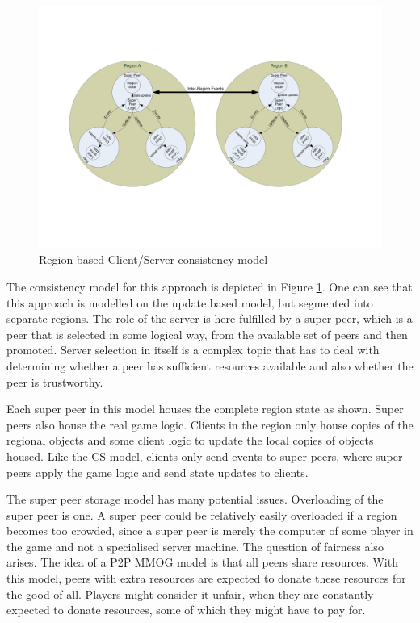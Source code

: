 \documentclass[journal,oneside,a4paper,onecolumn]{IEEEtran}
\begin{document}
\begin{figure}[htbp]
 \centering
 \includegraphics[clip=true, viewport=2cm 5cm 27cm 16.5cm, width=\columnwidth]{region_based_CS_CM}
 \caption{Region-based Client/Server consistency model}
 \label{fig_cs_region_cm}
\end{figure}
%
The consistency model for this approach is depicted in Figure \ref{fig_cs_region_cm}. One can see that this approach is modelled on the update based model, but segmented into separate regions. The role of the server is here fulfilled by a super peer, which is a peer that is selected in some logical way, from the available set of peers and then promoted. Server selection in itself is a complex topic that has to deal with determining whether a peer has sufficient resources available and also whether the peer is trustworthy.

Each super peer in this model houses the complete region state as shown. Super peers also house the real game logic. Clients in the region only house copies of the regional objects and some client logic to update the local copies of objects housed. Like the \ac{CS} model, clients only send events to super peers, where super peers apply the game logic and send state updates to clients.

The super peer storage model has many potential issues. Overloading of the super peer is one. A super peer could be relatively easily overloaded if a region becomes too crowded, since a super peer is merely the computer of some player in the game and not a specialised server machine. The question of fairness also arises. The idea of a P2P MMOG model is that all peers share resources. With this model, peers with extra resources are expected to donate these resources for the good of all. Players might consider it unfair, when they are constantly expected to donate resources, some of which they might have to pay for.
\end{document}
